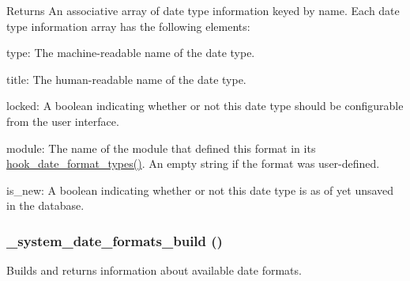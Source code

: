 \begin{DoxyReturn}{Returns}
An associative array of date type information keyed by name. Each date type information array has the following elements:
\begin{DoxyItemize}
\item type: The machine-\/readable name of the date type.
\item title: The human-\/readable name of the date type.
\item locked: A boolean indicating whether or not this date type should be configurable from the user interface.
\item module: The name of the module that defined this format in its \hyperlink{group__hooks_gaadde7af71d0b4f827cf7aac1c88c4d23}{hook\_\-date\_\-format\_\-types()}. An empty string if the format was user-\/defined.
\item is\_\-new: A boolean indicating whether or not this date type is as of yet unsaved in the database. 
\end{DoxyItemize}
\end{DoxyReturn}
\hypertarget{system_8module_a029d9166154fd78b3618b2e357ea3710}{
\subsubsection[{\_\-system\_\-date\_\-formats\_\-build}]{\setlength{\rightskip}{0pt plus 5cm}\_\-system\_\-date\_\-formats\_\-build ()}}
\label{system_8module_a029d9166154fd78b3618b2e357ea3710}
Builds and returns information about available date formats.

